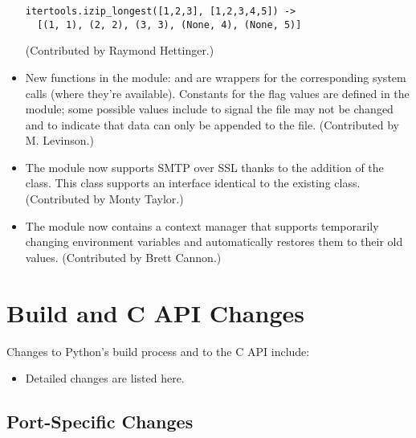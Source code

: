 \documentclass{howto}
\begin{document}
\begin{itemize}
\begin{verbatim}
itertools.izip_longest([1,2,3], [1,2,3,4,5]) ->
  [(1, 1), (2, 2), (3, 3), (None, 4), (None, 5)]
\end{verbatim}

(Contributed by Raymond Hettinger.)

\item New functions in the  module: 
and  are wrappers for the corresponding system
calls (where they're available).  Constants for the flag values are
defined in the  module; some possible values include
 to signal the file may not be changed and
 to indicate that data can only be appended to the
file.  (Contributed by M. Levinson.)

\item The  module now supports SMTP over 
SSL thanks to the addition of the  class.
This class supports an interface identical to the existing  
class. (Contributed by Monty Taylor.)

\item The  module now contains a
 context manager that 
supports temporarily changing environment variables and 
automatically restores them to their old values.
(Contributed by Brett Cannon.)

\end{itemize}




\section{Build and C API Changes}

Changes to Python's build process and to the C API include:

\begin{itemize}

\item Detailed changes are listed here.

\end{itemize}


\subsection{Port-Specific Changes}
\end{document}
